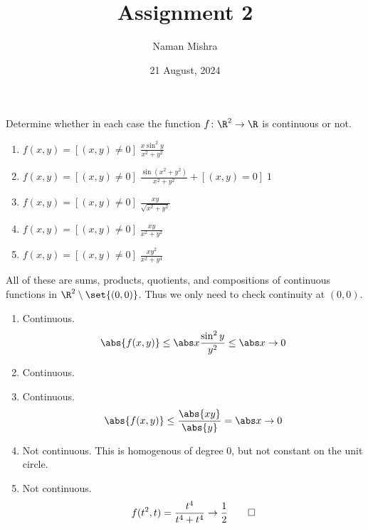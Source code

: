 \documentclass[12pt]{article}
\title{Assignment 2}
\author{Naman Mishra}
\date{21 August, 2024}
\begin{document}
\maketitle

\begin{problem} \label{prb:cont}
    Determine whether in each case the function $f\colon \R^2 \to \R$ is
    continuous or not.
    \begin{enumerate}
        \item $f(x, y) = [(x, y) \ne 0]\; \frac{x \sin^2 y}{x^2 + y^2}$
        \item $f(x, y) = [(x, y) \ne 0]\; \frac{\sin(x^2 + y^2)}{x^2 + y^2}
            + [(x, y) = 0]\; 1$
        \item $f(x, y) = [(x, y) \ne 0]\; \frac{xy}{\sqrt{x^2 + y^2}}$
        \item $f(x, y) = [(x, y) \ne 0]\; \frac{xy}{x^2 + y^2}$
            \label{prb:cont:sincos}
        \item $f(x, y) = [(x, y) \ne 0]\; \frac{xy^2}{x^2 + y^4}$
            \label{prb:cont:square-homo}
    \end{enumerate}
\end{problem}
\begin{solution}
    All of these are sums, products, quotients, and compositions of
    continuous functions in $\R^2 \setminus \set{(0, 0)}$.
    Thus we only need to check continuity at $(0, 0)$.
    \begin{enumerate}
        \item Continuous. \[
            \abs{f(x, y)} \le \abs x \frac{\sin^2 y}{y^2} \le \abs x \to 0
        \]
        \item Continuous. %
        \item Continuous.
        \[
            \abs{f(x, y)} \le \frac{\abs{xy}}{\abs{y}} = \abs x \to 0
        \]
        \item Not continuous. This is homogenous of degree 0, but not
        constant on the unit circle.
        \item Not continuous.
        \[
            f(t^2, t) = \frac{t^4}{t^4 + t^4} \to \frac12 \qedhere
        \]
    \end{enumerate}
\end{solution}
\end{document}
